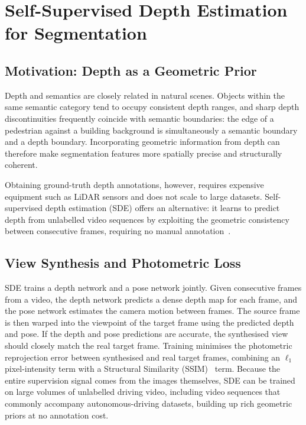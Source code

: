 \section{Self-Supervised Depth Estimation for Segmentation}
\label{sec:sde}

\subsection{Motivation: Depth as a Geometric Prior}

Depth and semantics are closely related in natural scenes. Objects within
the same semantic category tend to occupy consistent depth ranges, and
sharp depth discontinuities frequently coincide with semantic boundaries:
the edge of a pedestrian against a building background is simultaneously
a semantic boundary and a depth boundary. Incorporating geometric
information from depth can therefore make segmentation features more
spatially precise and structurally coherent.

Obtaining ground-truth depth annotations, however, requires expensive
equipment such as LiDAR sensors and does not scale to large datasets.
Self-supervised depth estimation (SDE) offers an alternative: it learns
to predict depth from unlabelled video sequences by exploiting the
geometric consistency between consecutive frames, requiring no manual
annotation~\cite{godard2017unsupervised}.

\subsection{View Synthesis and Photometric Loss}

SDE trains a depth network and a pose network jointly. Given consecutive
frames from a video, the depth network predicts a dense depth map for
each frame, and the pose network estimates the camera motion between
frames. The source frame is then warped into the viewpoint of the target
frame using the predicted depth and pose. If the depth and pose
predictions are accurate, the synthesised view should closely match the
real target frame. Training minimises the photometric reprojection error
between synthesised and real target frames, combining an $\ell_1$
pixel-intensity term with a Structural Similarity
(SSIM)~\cite{wang2004image} term. Because the entire supervision signal comes from the images themselves,
SDE can be trained on large volumes of unlabelled driving video, including
video sequences that commonly accompany autonomous-driving datasets,
building up rich geometric priors at no annotation cost.

